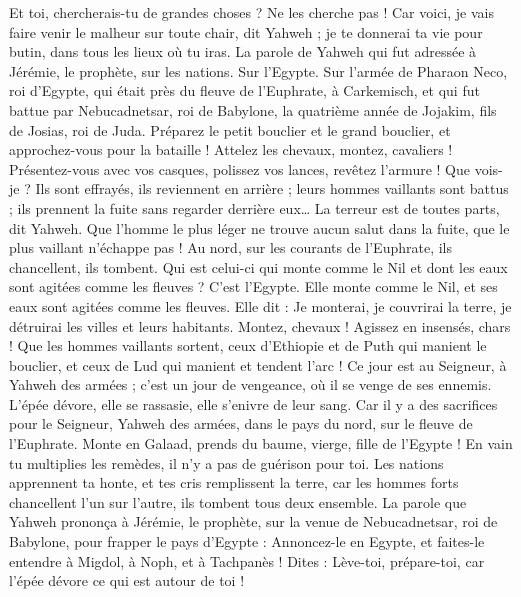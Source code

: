 \begin{multicols}{2}
Et toi, chercherais-tu de grandes choses ? Ne les cherche pas ! Car voici, je vais faire venir le malheur sur toute chair, dit Yahweh ; je te donnerai ta vie pour butin, dans tous les lieux où tu iras.
\VerseOne{}La parole de Yahweh qui fut adressée à Jérémie, le prophète, sur les nations.
Sur l'Egypte. Sur l'armée de Pharaon Neco, roi d'Egypte, qui était près du fleuve de l'Euphrate, à Carkemisch, et qui fut battue par Nebucadnetsar, roi de Babylone, la quatrième année de Jojakim, fils de Josias, roi de Juda.
Préparez le petit bouclier et le grand bouclier, et approchez-vous pour la bataille !
Attelez les chevaux, montez, cavaliers ! Présentez-vous avec vos casques, polissez vos lances, revêtez l'armure !
Que vois-je ? Ils sont effrayés, ils reviennent en arrière ; leurs hommes vaillants sont battus ; ils prennent la fuite sans regarder derrière eux… La terreur est de toutes parts, dit Yahweh.
Que l'homme le plus léger ne trouve aucun salut dans la fuite, que le plus vaillant n'échappe pas ! Au nord, sur les courants de l'Euphrate, ils chancellent, ils tombent.
Qui est celui-ci qui monte comme le Nil et dont les eaux sont agitées comme les fleuves ?
C'est l'Egypte. Elle monte comme le Nil, et ses eaux sont agitées comme les fleuves. Elle dit : Je monterai, je couvrirai la terre, je détruirai les villes et leurs habitants.
Montez, chevaux ! Agissez en insensés, chars ! Que les hommes vaillants sortent, ceux d'Ethiopie et de Puth qui manient le bouclier, et ceux de Lud qui manient et tendent l'arc !
Ce jour est au Seigneur, à Yahweh des armées ; c'est un jour de vengeance, où il se venge de ses ennemis. L'épée dévore, elle se rassasie, elle s'enivre de leur sang. Car il y a des sacrifices pour le Seigneur, Yahweh des armées, dans le pays du nord, sur le fleuve de l'Euphrate.
Monte en Galaad, prends du baume, vierge, fille de l'Egypte ! En vain tu multiplies les remèdes, il n'y a pas de guérison pour toi.
Les nations apprennent ta honte, et tes cris remplissent la terre, car les hommes forts chancellent l'un sur l'autre, ils tombent tous deux ensemble.
La parole que Yahweh prononça à Jérémie, le prophète, sur la venue de Nebucadnetsar, roi de Babylone, pour frapper le pays d'Egypte :
Annoncez-le en Egypte, et faites-le entendre à Migdol, à Noph, et à Tachpanès ! Dites : Lève-toi, prépare-toi, car l'épée dévore ce qui est autour de toi !

\end{multicols}
